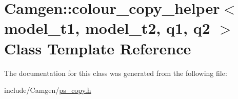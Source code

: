 \hypertarget{a00074}{\section{Camgen\-:\-:colour\-\_\-copy\-\_\-helper$<$ model\-\_\-t1, model\-\_\-t2, q1, q2 $>$ Class Template Reference}
\label{a00074}
}


The documentation for this class was generated from the following file\-:\begin{DoxyCompactItemize}
\item 
include/\-Camgen/\hyperlink{a00712}{ps\-\_\-copy.\-h}\end{DoxyCompactItemize}
